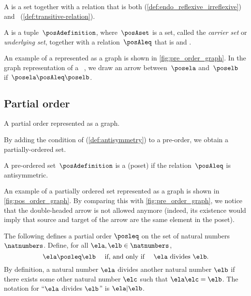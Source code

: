 A  is a set together with a relation that is both  (\cref{def:endo_reflexive_irreflexive}) and ~(\cref{def:transitive-relation}).
\begin{ctdefinition}
    \label{def:preorder}
    A  is a tuple~$\posAdefinition$, where~$\posAset$ is a set, called the \emph{carrier set} or \emph{underlying set}, together with a relation~$\posAleq$ that is
     and .
\end{ctdefinition}
An example of a  represented as a graph is shown in \cref{fig:pre_order_graph}.
In the graph representation of a ~\posA, we draw an arrow between~$\posela$ and~$\poselb$ if~$\posela \posAleq \poselb$.


\vfill

\subsection{Partial order}



\begin{marginfigure}
    \centering
    \caption{A partial order represented as a graph.}
    \label{fig:pos_order_graph}
\end{marginfigure}
By adding the condition of \emph{} (\cref{def:antisymmetry}) to a pre-order, we obtain a partially-ordered set.

\begin{ctdefinition}
    \label{def:poset}
    A pre-ordered set~$\posAdefinition$ is a  (poset) if the relation~$\posAleq$ is antisymmetric.
\end{ctdefinition}

An example of a partially ordered set represented as a graph is shown in \cref{fig:pos_order_graph}.
By comparing this with \cref{fig:pre_order_graph}, we notice that the double-headed arrow is not allowed anymore (indeed, its existence would imply that source and target of the arrow are the same element in the poset).



\begin{example}
The following defines a partial order $\posleq$ on the set of natural numbers $\natnumbers$. Define, for all $\ela, \elb \in \natnumbers$, 
\begin{equation}
\ela \posleq \elb \quad \text{ if, and only if } \quad \ela \text{ divides } \elb.
\end{equation}
By definition, a natural number $\ela$ divides another natural number $\elb$ if there exists some other natural number $\elc$ such that $\ela \elc = \elb$. The notation for ``$\ela$ divides $\elb$'' is $\ela \vert \elb$. 

\end{example}

